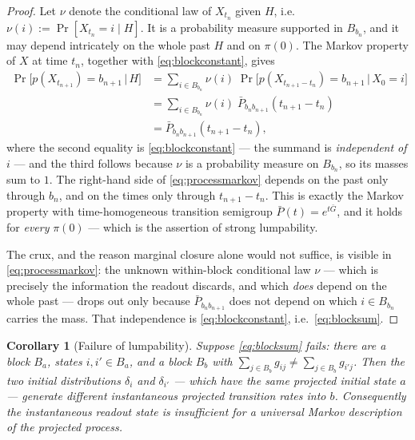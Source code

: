 \documentclass[11pt,reqno]{amsart}
\theoremstyle{plain}
\newtheorem{corollary}[theorem]{Corollary}
\theoremstyle{definition}
\theoremstyle{remark}
\begin{document}
\begin{proof}
Let $\nu$ denote the conditional law of $X_{t_n}$ given $H$, i.e.\ $\nu(i):=\Pr[X_{t_n}=i\mid H]$. It is a probability measure supported in $B_{b_n}$, and it may depend intricately on the whole past $H$ and on $\pi(0)$. The Markov property of $X$ at time $t_n$, together with \eqref{eq:blockconstant}, gives
\begin{equation}\label{eq:processmarkov}
\begin{aligned}
\Pr\bigl[p(X_{t_{n+1}})=b_{n+1}\,\big|\,H\bigr]
&=\sum_{i\in B_{b_n}}\nu(i)\;\Pr\bigl[p(X_{t_{n+1}-t_n})=b_{n+1}\,\big|\,X_0=i\bigr]\\[2pt]
&=\sum_{i\in B_{b_n}}\nu(i)\;\bar P_{b_nb_{n+1}}(t_{n+1}-t_n)\\[2pt]
&=\bar P_{b_nb_{n+1}}(t_{n+1}-t_n),
\end{aligned}
\end{equation}
where the second equality is \eqref{eq:blockconstant} --- the summand is \emph{independent of $i$} --- and the third follows because $\nu$ is a probability measure on $B_{b_n}$, so its masses sum to $1$. The right-hand side of \eqref{eq:processmarkov} depends on the past only through $b_n$, and on the times only through $t_{n+1}-t_n$. This is exactly the Markov property with time-homogeneous transition semigroup $\bar P(t)=e^{t\bar G}$, and it holds for \emph{every} $\pi(0)$ --- which is the assertion of strong lumpability.

The crux, and the reason marginal closure alone would not suffice, is visible in \eqref{eq:processmarkov}: the unknown within-block conditional law $\nu$ --- which is precisely the information the readout discards, and which \emph{does} depend on the whole past --- drops out only because $\bar P_{b_n b_{n+1}}$ does not depend on which $i\in B_{b_n}$ carries the mass. That independence is \eqref{eq:blockconstant}, i.e.\ \eqref{eq:blocksum}.
\end{proof}

\begin{corollary}[Failure of lumpability]\label{cor:nonmarkov}
Suppose \eqref{eq:blocksum} fails: there are a block $B_a$, states $i,i'\in B_a$, and a block $B_b$ with $\sum_{j\in B_b}g_{ij}\neq\sum_{j\in B_b}g_{i'j}$. Then the two initial distributions $\delta_i$ and $\delta_{i'}$ --- which have the \emph{same} projected initial state $a$ --- generate different instantaneous projected transition rates into $b$. Consequently the instantaneous readout state is insufficient for a universal Markov description of the projected process.
\end{corollary}
\end{document}
